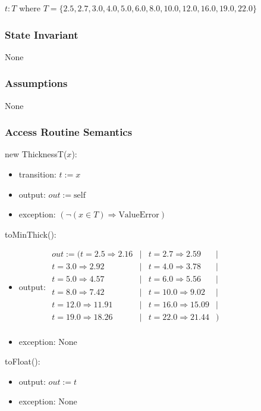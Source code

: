 \documentclass[12pt, titlepage]{article}
\begin{document}
$t: T$ where $T = \{2.5, 2.7, 3.0, 4.0, 5.0, 6.0, 8.0, 10.0, 12.0, 16.0, 19.0, 22.0 \}$

\subsubsection {State Invariant}

None

\subsubsection {Assumptions}

None

\subsubsection {Access Routine Semantics}

\noindent new ThicknessT($x$):
\begin{itemize}
\item transition: $t := x$
\item output: $out := \mbox{self}$
\item exception: $(\neg (x \in T) \Rightarrow \mbox{ValueError})$
\end{itemize}

\noindent toMinThick():
\begin{itemize}
\item output: $\begin{array}{rcrc}
out := ( t  = 2.5 \Rightarrow 2.16 & | & t = 2.7 \Rightarrow 2.59 & |\\
t = 3.0 \Rightarrow 2.92 & | & t = 4.0 \Rightarrow 3.78 & |\\
t = 5.0 \Rightarrow 4.57 & | & t = 6.0 \Rightarrow 5.56 & |\\
t = 8.0 \Rightarrow 7.42 & | & t = 10.0 \Rightarrow 9.02 & |\\
t = 12.0 \Rightarrow 11.91 & | & t = 16.0 \Rightarrow 15.09 & |\\
t = 19.0 \Rightarrow 18.26 & | & t = 22.0 \Rightarrow 21.44 & )\\
\end{array}$
\item exception: None
\end{itemize}

\noindent toFloat():
\begin{itemize}
\item output: $out := t$
\item exception: None
\end{itemize}
\end{document}
